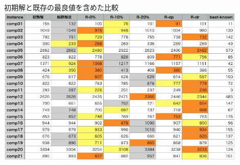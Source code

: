 \documentclass[11pt,dvipdfmx]{beamer}
\begin{document}
\begin{frame}{初期解と既存の最良値を含めた比較}
  \centering
 \includegraphics[width=12cm]{pic/comp.png}
\end{frame}
\end{document}
